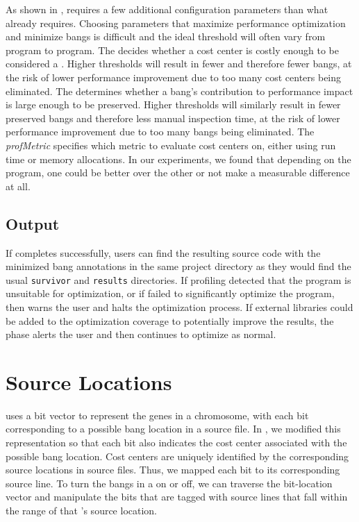As shown in , \At{} requires a few additional
configuration parameters than what \Ao{} already requires.
Choosing parameters that maximize performance optimization
and minimize bangs is difficult and the ideal threshold
will often vary from program to program. The \hotspotcost{} decides
whether a cost center is costly enough to be considered a \hotspot{}.
Higher \hotspotcost{} thresholds will result in fewer \hotspots{} and therefore
fewer bangs, at the risk of lower performance improvement due to too
many cost centers being eliminated. The \absim{} determines whether
a bang's contribution to performance impact is large enough to be preserved.
Higher \absim{} thresholds will similarly result in fewer preserved bangs
and therefore less manual inspection time, at the risk of lower performance
improvement due to too many bangs being eliminated. The \textit{profMetric} specifies
which metric to evaluate cost centers on, either using run time or memory
allocations. In our experiments, we found that depending on the program,
one \profm{} could be better over the other or not make a measurable
difference at all.


\subsection{\At{} Output}

If \At{} completes successfully, users can find the resulting source
code with the minimized bang annotations in the same project
directory as they would find the usual \Ao{} \texttt{survivor}
and \texttt{results} directories. If \preopt{} profiling detected that
the program is unsuitable for optimization, or if \Ao{} failed to
significantly optimize the program, then \At{} warns the user and
halts the optimization process. If external libraries could be added to
the optimization coverage to potentially improve the results,
the \preopt{} phase alerts the user and then continues to optimize as
normal.


\section{Source Locations}

\Ao{} uses a bit vector to represent the genes in a
chromosome, with each bit corresponding to a possible bang location in
a source file.  In \At{}, we modified this representation so that each
bit also indicates the cost center associated with the possible bang
location.   Cost centers are uniquely identified by the corresponding source
locations in source files.  Thus, we mapped each bit to its corresponding
source line. To turn the bangs in a \hotspot{} on or off, we can
traverse the bit-location vector and manipulate the bits that are
tagged with source lines that fall within the range of
that \hotspot{}'s source location.

